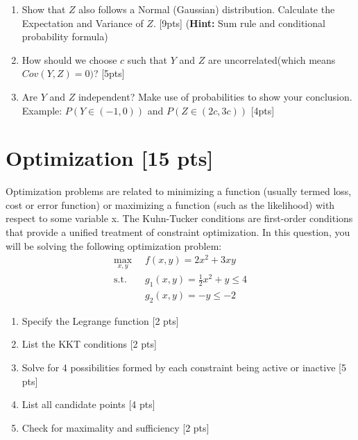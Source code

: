 \documentclass{article}
\begin{document}
\begin{enumerate}[label=(\alph*)]
    
\item Show that $Z$ also follows a Normal (Gaussian) distribution. Calculate the Expectation and Variance of $Z$. [9pts]
(\textbf{Hint:} Sum rule and conditional probability formula)

        
\item How should we choose $c$ such that $Y$ and $Z$ are uncorrelated(which means $Cov(Y,Z) = 0)$? [5pts]
    

\item Are $Y$ and $Z$ independent? Make use of probabilities to show your conclusion. Example: $P(Y\in(-1,0))$ and $P(Z\in(2c,3c))$ [4pts]



\end{enumerate} 


\section{Optimization [15 pts]}
Optimization problems are related to minimizing a function (usually termed loss, cost or error function) or maximizing a function (such as the likelihood) with respect to some variable x. The Kuhn-Tucker conditions are first-order conditions that provide a unified treatment of constraint optimization. In this question, you will be solving the following optimization problem:\\

\begin{align*}
    \max_{x,y} \;\;& f(x,y) = 2x^{2}+3xy \\
    \text{s.t.} \;\;& g_{1}(x,y) = \frac{1}{2}x^{2}+y \leq 4 \\
    & g_{2}(x,y) =-y \leq -2
\end{align*}



\begin{enumerate}[label=(\alph*)]
\item Specify the Legrange function [2 pts]
\item List the KKT conditions  [2 pts]
\item Solve for 4 possibilities formed by each  constraint being active or inactive  [5 pts]
\item List all candidate points  [4 pts]
\item Check for maximality and sufficiency  [2 pts]
\end{enumerate}
\end{document}
